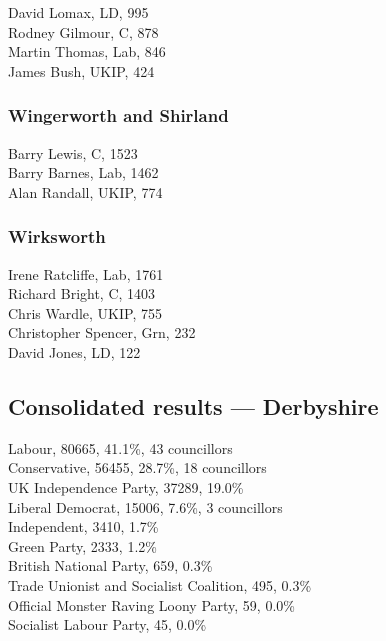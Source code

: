 \documentclass[a4paper,openany,10pt]{book}
\begin{document}
David Lomax, LD, 995\\
Rodney Gilmour, C, 878\\
Martin Thomas, Lab, 846\\
James Bush, UKIP, 424\\


\subsubsection*{Wingerworth and Shirland}



Barry Lewis, C, 1523\\
Barry Barnes, Lab, 1462\\
Alan Randall, UKIP, 774\\


\subsubsection*{Wirksworth}



Irene Ratcliffe, Lab, 1761\\
Richard Bright, C, 1403\\
Chris Wardle, UKIP, 755\\
Christopher Spencer, Grn, 232\\
David Jones, LD, 122\\




\subsection*{Consolidated results --- Derbyshire}
Labour, 80665, 41.1\%, 43 councillors\\
Conservative, 56455, 28.7\%, 18 councillors\\
UK Independence Party, 37289, 19.0\% \\
Liberal Democrat, 15006, 7.6\%, 3 councillors\\
Independent, 3410, 1.7\% \\
Green Party, 2333, 1.2\% \\
British National Party, 659, 0.3\% \\
Trade Unionist and Socialist Coalition, 495, 0.3\% \\
Official Monster Raving Loony Party, 59, 0.0\% \\
Socialist Labour Party, 45, 0.0\% \\
\end{document}
